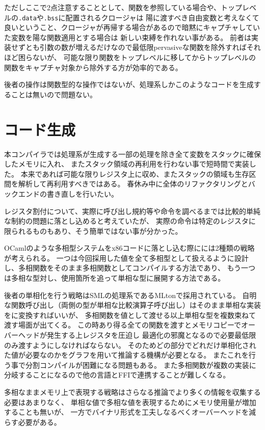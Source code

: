 \documentclass[report]{jlreq}
\begin{document}
      ただしここで2点注意することとして、関数を参照している場合や、トップレベルの\texttt{.data}や\texttt{.bss}に配置されるクロージャは
      陽に渡すべき自由変数と考えなくて良いということ、クロージャが再帰する場合があるので暗黙にキャプチャしていた変数を陽な関数適用とする場合は
      新しい束縛を作れない事がある。
      前者は実装せずとも引数の数が増えるだけなので最低限pervasiveな関数を除外すればそれほど困らないが、
      可能な限り関数をトップレベルに移してからトップレベルの関数をキャプチャ対象から除外する方が効率的である。

      後者の操作は関数型的な操作ではないが、処理系しかこのようなコードを生成することは無いので問題ない。
    \section{コード生成}
      本コンパイラでは処理系が生成する一部の処理を除き全て変数をスタックに確保したメモリに入れ、
      またスタック領域の再利用を行わない事で短時間で実装した。
      本来であれば可能な限りレジスタ上に収め、またスタックの領域も生存区間を解析して再利用すべきではある。
      春休み中に全体のリファクタリングとバックエンドの書き直しを行いたい。

      レジスタ割付について、実際に呼び出し規約等や命令を調べるまでは比較的単純な制約の問題に落とし込めると考えていたが、
      実際の命令は特定のレジスタに限られるものもあり、そう簡単ではない事が分かった。

      OCamlのような多相型システムをx86コードに落とし込む際にには2種類の戦略が考えられる。
      一つは今回採用した値を全て多相型として扱えるように設計し、多相関数をそのまま多相関数としてコンパイルする方法であり、
      もう一つは多相な型対し、使用箇所を追って単相な型に展開する方法である。

      後者の単相化を行う戦略はSMLの処理系であるMLton\cite{weeks2006whole}で採用されている。
      自明な関数呼び出し（両側の型が単相な比較演算子呼び出し）はそのまま単相な実装をに変換すればいいが、
      多相関数を値として渡せる以上単相な型を複数束ねて渡す場面が出てくる。
      この時あり得る全ての関数を渡すとメモリコピーでオーバーヘッドが発生する上レジスタを圧迫し
      最適化の邪魔となるので必要最低限のみ渡すようにしなければならない。
      そのためどの部分でどれだけ単相化された値が必要なのかをグラフを用いて推論する機構が必要となる。
      またこれを行う事で分割コンパイルが困難になる問題もある。
      また多相関数が複数の実装に分岐することになるので他の言語とFFIで連携することが難しくなる。

      多相なままメモリ上で表現する戦略はさらなる推論でより多くの情報を収集する必要はあまりなく、
      単相な値で多相な値を表現するためにメモリ使用量が増加することも無いが、
      一方でバイナリ形式を工夫しなるべくオーバーヘッドを減らす必要がある。
\end{document}
